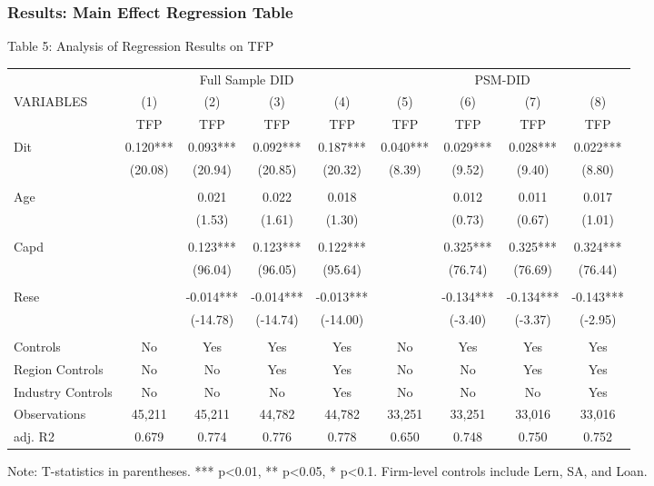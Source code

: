 \documentclass[aspectratio=169]{beamer}
\begin{document}
\begin{frame}[fragile]
    \frametitle{Results: Main Effect Regression Table}
    \begin{block}{Table 5: Analysis of Regression Results on TFP}
    \centering
    \setlength{\tabcolsep}{3pt} 
    \tiny
    \begin{tabular}{l c c c c c c c c}
    \toprule
    & \multicolumn{4}{c}{Full Sample DID} & \multicolumn{4}{c}{PSM-DID} \\
    \cmidrule(lr){2-5} \cmidrule(lr){6-9}
    VARIABLES & (1) & (2) & (3) & (4) & (5) & (6) & (7) & (8) \\
    & TFP & TFP & TFP & TFP & TFP & TFP & TFP & TFP \\
    \midrule
    Dit & 0.120*** & 0.093*** & 0.092*** & 0.187*** & 0.040*** & 0.029*** & 0.028*** & 0.022*** \\
    & (20.08) & (20.94) & (20.85) & (20.32) & (8.39) & (9.52) & (9.40) & (8.80) \\
    \\
    Age & & 0.021 & 0.022 & 0.018 & & 0.012 & 0.011 & 0.017 \\
    & & (1.53) & (1.61) & (1.30) & & (0.73) & (0.67) & (1.01) \\
    \\
    Capd & & 0.123*** & 0.123*** & 0.122*** & & 0.325*** & 0.325*** & 0.324*** \\
    & & (96.04) & (96.05) & (95.64) & & (76.74) & (76.69) & (76.44) \\
    \\
    Rese & & -0.014*** & -0.014*** & -0.013*** & & -0.134*** & -0.134*** & -0.143*** \\
    & & (-14.78) & (-14.74) & (-14.00) & & (-3.40) & (-3.37) & (-2.95) \\
    \\
    Controls & No & Yes & Yes & Yes & No & Yes & Yes & Yes \\
    Region Controls & No & No & Yes & Yes & No & No & Yes & Yes \\
    Industry Controls & No & No & No & Yes & No & No & No & Yes \\
    \midrule
    Observations & 45,211 & 45,211 & 44,782 & 44,782 & 33,251 & 33,251 & 33,016 & 33,016 \\
    adj. R2 & 0.679 & 0.774 & 0.776 & 0.778 & 0.650 & 0.748 & 0.750 & 0.752 \\
    \bottomrule
    \end{tabular}
    \end{block}
    \tiny Note: T-statistics in parentheses. *** p<0.01, ** p<0.05, * p<0.1. Firm-level controls include Lern, SA, and Loan.
\end{frame}
\end{document}
